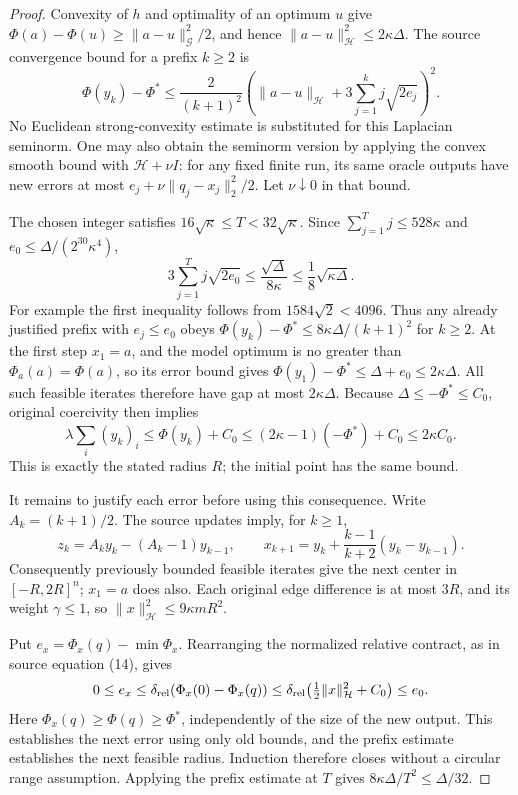 \begin{proof}
Convexity of $h$ and optimality of an optimum $u$ give
$\Phi(a)-\Phi(u)\geq\|a-u\|_{\mathcal G}^2/2$, and hence
$\|a-u\|_{\mathcal H}^2\leq2\kappa\Delta$.
The source convergence bound for a prefix $k\geq2$ is
\begin{equation}
 \Phi(y_k)-\Phi^*\leq\frac2{(k+1)^2}
 \left(\|a-u\|_{\mathcal H}
       +3\sum_{j=1}^k j\sqrt{2e_j}\right)^2.
 \label{eq:op3-source-inexact-apg-bound}
\end{equation}
No Euclidean strong-convexity estimate is substituted for this Laplacian
seminorm. One may also obtain the seminorm version by applying the convex
smooth bound with $\mathcal H+\nu I$: for any fixed finite run, its same
oracle outputs have new errors at most
$e_j+\nu\|q_j-x_j\|_2^2/2$. Let $\nu\downarrow0$ in that bound.

The chosen integer satisfies $16\sqrt\kappa\leq T<32\sqrt\kappa$.
Since $\sum_{j=1}^Tj\leq528\kappa$ and
$e_0\leq\Delta/(2^{30}\kappa^4)$,
\[
 3\sum_{j=1}^T j\sqrt{2e_0}
 \leq\frac{\sqrt\Delta}{8\kappa}
 \leq\frac18\sqrt{\kappa\Delta}.
\]
For example the first inequality follows from
$1584\sqrt2<4096$. Thus any already justified prefix with
$e_j\leq e_0$ obeys
$\Phi(y_k)-\Phi^*\leq8\kappa\Delta/(k+1)^2$ for $k\geq2$.
At the first step $x_1=a$, and the model optimum is no greater than
$\Phi_a(a)=\Phi(a)$, so its error bound gives
$\Phi(y_1)-\Phi^*\leq\Delta+e_0\leq2\kappa\Delta$.
All such feasible iterates therefore have gap at most $2\kappa\Delta$.
Because $\Delta\leq-\Phi^*\leq C_0$, original coercivity then implies
\[
 \lambda\sum_i(y_k)_i
 \leq\Phi(y_k)+C_0
 \leq(2\kappa-1)(-\Phi^*)+C_0\leq2\kappa C_0.
\]
This is exactly the stated radius $R$; the initial point has the same bound.

It remains to justify each error before using this consequence. Write
$A_k=(k+1)/2$. The source updates imply, for $k\geq1$,
\[
 z_k=A_ky_k-(A_k-1)y_{k-1},\qquad
 x_{k+1}=y_k+\frac{k-1}{k+2}(y_k-y_{k-1}).
\]
Consequently previously bounded feasible iterates give the next center
in $[-R,2R]^n$; $x_1=a$ does also. Each original edge difference is at
most $3R$, and its weight $\gamma\leq1$, so
$\|x\|_{\mathcal H}^2\leq9\kappa mR^2$.

Put $e_x=\Phi_x(q)-\min\Phi_x$. Rearranging the normalized relative
contract, as in source equation (14), gives
\[
 0\leq e_x\leq\delta_{\rm rel}(\Phi_x(0)-\Phi_x(q))
 \leq\delta_{\rm rel}\bigl(\tfrac12\|x\|_{\mathcal H}^2+C_0\bigr)
 \leq e_0.
\]
Here $\Phi_x(q)\geq\Phi(q)\geq\Phi^*$, independently of the size
of the new output. This establishes the next error using only old bounds,
and the prefix estimate establishes the next feasible radius. Induction
therefore closes without a circular range assumption. Applying the prefix
estimate at $T$ gives $8\kappa\Delta/T^2\leq\Delta/32$.


\end{proof}
